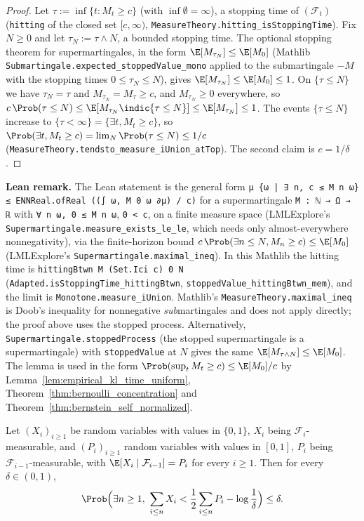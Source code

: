 \begin{proof}
\leanok
Let $\tau := \inf\{t : M_t \ge c\}$ (with $\inf \emptyset = \infty$), a stopping time of
$(\mathcal F_t)$ (\texttt{hitting} of the closed set $[c, \infty)$,
\texttt{MeasureTheory.hitting\_isStoppingTime}). Fix $N \ge 0$ and let $\tau_N := \tau \wedge N$,
a bounded stopping time. The optional stopping theorem for supermartingales, in the form
$\E[M_{\tau_N}] \le \E[M_0]$ (Mathlib \texttt{Submartingale.expected\_stoppedValue\_mono}
applied to the submartingale $-M$ with the stopping times $0 \le \tau_N \le N$), gives
$\E[M_{\tau_N}] \le \E[M_0] \le 1$. On $\{\tau \le N\}$ we have $\tau_N = \tau$ and
$M_{\tau_N} = M_\tau \ge c$, and $M_{\tau_N} \ge 0$ everywhere, so
$c\, \Prob(\tau \le N) \le \E[M_{\tau_N} \indic\{\tau \le N\}] \le \E[M_{\tau_N}] \le 1$.
The events $\{\tau \le N\}$ increase to $\{\tau < \infty\} = \{\exists t, M_t \ge c\}$, so
$\Prob(\exists t, M_t \ge c) = \lim_N \Prob(\tau \le N) \le 1/c$
(\texttt{MeasureTheory.tendsto\_measure\_iUnion\_atTop}). The second claim is $c = 1/\delta$.
\end{proof}

\textbf{Lean remark.} The Lean statement is the general form
\texttt{μ \{ω | ∃ n, c ≤ M n ω\} ≤ ENNReal.ofReal ((∫ ω, M 0 ω ∂μ) / c)} for a supermartingale
\texttt{M : ℕ → Ω → ℝ} with \texttt{∀ n ω, 0 ≤ M n ω}, \texttt{0 < c}, on a finite measure space
(LMLExplore's \texttt{Supermartingale.measure\_exists\_le\_le}, which needs only almost-everywhere
nonnegativity), via the finite-horizon bound $c\,\Prob(\exists n \le N, M_n \ge c) \le \E[M_0]$
(LMLExplore's \texttt{Supermartingale.maximal\_ineq}). In this Mathlib the hitting time is \texttt{hittingBtwn M (Set.Ici c) 0 N}
(\texttt{Adapted.isStoppingTime\_hittingBtwn}, \texttt{stoppedValue\_hittingBtwn\_mem}), and the
limit is \texttt{Monotone.measure\_iUnion}. Mathlib's \texttt{MeasureTheory.maximal\_ineq} is Doob's inequality
for nonnegative \emph{sub}martingales and does not apply directly; the proof above uses the
stopped process. Alternatively, \texttt{Supermartingale.stoppedProcess} (the stopped
supermartingale is a supermartingale) with \texttt{stoppedValue} at $N$ gives the same
$\E[M_{\tau \wedge N}] \le \E[M_0]$. The lemma is used in the form
$\Prob(\sup_t M_t \ge c) \le \E[M_0]/c$ by Lemma~\ref{lem:empirical_kl_time_uniform},
Theorem~\ref{thm:bernoulli_concentration} and Theorem~\ref{thm:bernstein_self_normalized}.

\begin{theorem}\label{thm:bernoulli_concentration}
\leanok
Let $(X_i)_{i \ge 1}$ be random variables with values in $\{0, 1\}$, $X_i$ being
$\mathcal F_i$-measurable, and $(P_i)_{i \ge 1}$ random variables with values in $[0, 1]$, $P_i$
being $\mathcal F_{i - 1}$-measurable, with $\E[X_i \mid \mathcal F_{i-1}] = P_i$ for every
$i \ge 1$. Then for every $\delta \in (0, 1)$,
\[
  \Prob\Big( \exists n \ge 1,\ \sum_{i \le n} X_i < \frac12 \sum_{i \le n} P_i - \log\frac1\delta \Big) \le \delta .
\]
\end{theorem}

